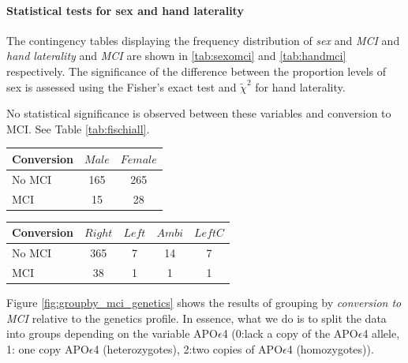\documentclass[11pt]{article}
\theoremstyle{definition}
\theoremstyle{remark}
\begin{document}
\paragraph*{Statistical tests for sex and hand laterality}

The contingency tables displaying the frequency distribution of \emph{sex} and \emph{MCI} and \emph{hand laterality} and \emph{MCI} are shown in \ref{tab:sexomci} and \ref{tab:handmci} respectively. The significance of the difference between the proportion levels of sex is assessed using the Fisher's exact test and $\tilde{\chi}^2$ for hand laterality.

No statistical significance is observed between these variables and conversion to MCI. See Table \ref{tab:fischiall}. 

\begin{minipage}[b]{.40\textwidth}
   \centering
    \begin{tabular}[t]{lcc}
    \hline
    Conversion&{$Male$}&{$Female$} \\
    \hline
    No MCI&165&265\\
    MCI&15&28\\
    \hline
  \end{tabular}
   \label{tab:sexomci}
\end{minipage} %
\begin{minipage}[b]{.40\textwidth}
   \centering
    \begin{tabular}[t]{lcccc}
    \hline
    Conversion&{$Right$}&{$Left$}&{$Ambi$}&{$LeftC$} \\
    \hline
    No MCI&365&7&14&7\\
    MCI&38&1&1&1\\
    \hline
  \end{tabular}
   \label{tab:handmci}
\end{minipage}

Figure \ref{fig:groupby_mci_genetics} shows the results of grouping by \emph{conversion to MCI} relative to the genetics profile. In essence, what we do is to split the data into groups depending on the variable APO$\epsilon$4 (0:lack a copy of the APO$\epsilon$4 allele, 1: one copy APO$\epsilon$4 (heterozygotes), 2:two copies of APO$\epsilon$4 (homozygotes)). 
\end{document}
